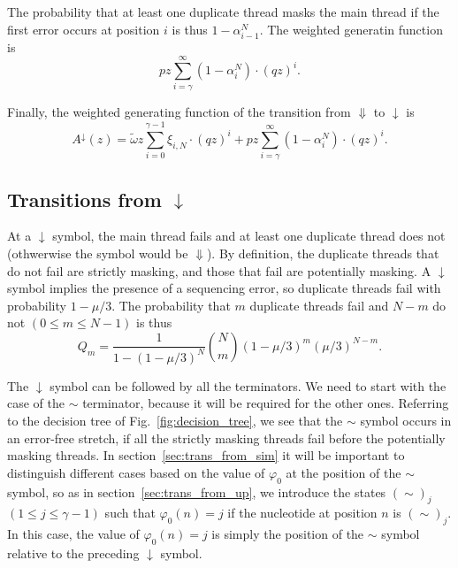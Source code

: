 \documentclass{article}
\begin{document}
The probability that at least one duplicate thread masks the main thread
if the first error occurs at position $i$ is thus $1 - \alpha_{i-1}^N$.
The weighted generatin function is
\begin{equation}
pz\sum_{i=\gamma}^\infty (1 - \alpha_i^N) \cdot (qz)^i.
\end{equation}

Finally, the weighted generating function of the transition from
$\Downarrow$ to $\downarrow$ is
\begin{equation}
A^\downarrow(z) =
\tilde{\omega} z \sum_{i=0}^{\gamma-1} \xi_{i,N} \cdot (qz)^i +
pz\sum_{i=\gamma}^\infty (1 - \alpha_i^N) \cdot (qz)^i.
\end{equation}

\subsection{Transitions from $\downarrow$}
\label{sec:trans_from_down}

At a $\downarrow$ symbol, the main thread fails and at least one duplicate
thread does not (othwerwise the symbol would be $\Downarrow$). By
definition, the duplicate threads that do not fail are strictly masking,
and those that fail are potentially masking. A $\downarrow$ symbol implies
the presence of a sequencing error, so duplicate threads fail with
probability $1-\mu/3$. The probability that $m$ duplicate threads fail and
$N-m$ do not $(0 \leq m \leq N-1)$ is thus
\begin{equation}
  Q_m = \frac{1}{1-(1-\mu/3)^N}{N \choose m} (1-\mu/3)^m(\mu/3)^{N-m}.
\end{equation}

The $\downarrow$ symbol can be followed by all the terminators. We need to
start with the case of the $\sim$ terminator, because it will be required
for the other ones. Referring to the decision tree of
Fig.~\ref{fig:decision_tree}, we see that the $\sim$ symbol occurs in an
error-free stretch, if all the strictly masking threads fail before the
potentially masking threads. In section~\ref{sec:trans_from_sim} it will
be important to distinguish different cases based on the value of
$\varphi_0$ at the position of the $\sim$ symbol, so as in
section~\ref{sec:trans_from_up}, we introduce the states $(\sim)_j$ $(1
\leq j \leq \gamma-1)$ such that $\varphi_0(n) = j$ if the nucleotide at
position $n$ is $(\sim)_j$. In this case, the value of $\varphi_0(n) = j$
is simply the position of the $\sim$ symbol relative to the preceding
$\downarrow$ symbol.
\end{document}
